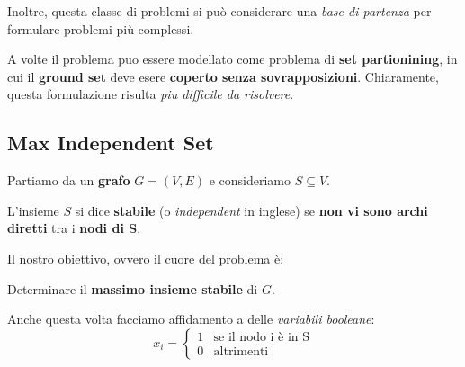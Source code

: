 Inoltre, questa classe di problemi si può considerare una \textit{base di partenza}
per formulare problemi più complessi.

\begin{remark}
    A volte il problema puo essere modellato come
    problema di \textbf{set partionining}, in cui il
    \textbf{ground set} deve esere \textbf{coperto senza sovrapposizioni}.
    Chiaramente, questa formulazione risulta \textit{piu difficile da risolvere}.
\end{remark}

\subsection{Max Independent Set}

Partiamo da un \textbf{grafo} $G=(V,E)$ e consideriamo $S\subseteq V$.

\begin{definition}
    L'insieme $S$ si dice \textbf{stabile} (o \textit{independent} in inglese) 
    se \textbf{non vi sono archi diretti} tra i \textbf{nodi di S}.
\end{definition}

Il nostro obiettivo, ovvero il cuore del problema è:

\begin{exa}
    Determinare il \textbf{massimo insieme stabile} di $G$.
\end{exa}

Anche questa volta facciamo affidamento a delle \textit{variabili booleane}:
\[
    x_i = \begin{cases}
        1 & \text{se il nodo i è in S} \\ 
        0 & \text{altrimenti}
    \end{cases}
\]

